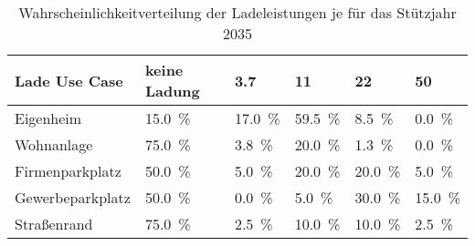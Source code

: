 {
\renewcommand{\arraystretch}{1.2}%
\begin{table}[H]
	\begin{center}
		\caption{Wahrscheinlichkeitverteilung der Ladeleistungen je \UC für das Stützjahr \num{2035}}
		\begin{tabu} to \textwidth {X[1.7] X[1.3, r] X[1, r] X[1, r] X[1, r] X[1, r]}
			\hline
			Lade Use   Case  & keine Ladung        & \SI{3.7}{\kw}       & \SI{11}{\kw}        & \SI{22}{\kw}        & \SI{50}{\kw}        \\ \hline
			Eigenheim        & \SI{15.0}{\percent} & \SI{17.0}{\percent} & \SI{59.5}{\percent} & \SI{8.5}{\percent}  & \SI{0.0}{\percent}  \\
			Wohnanlage       & \SI{75.0}{\percent} & \SI{3.8}{\percent}  & \SI{20.0}{\percent} & \SI{1.3}{\percent}  & \SI{0.0}{\percent}  \\
			Firmenparkplatz  & \SI{50.0}{\percent} & \SI{5.0}{\percent}  & \SI{20.0}{\percent} & \SI{20.0}{\percent} & \SI{5.0}{\percent}  \\
			Gewerbeparkplatz & \SI{50.0}{\percent} & \SI{0.0}{\percent}  & \SI{5.0}{\percent}  & \SI{30.0}{\percent} & \SI{15.0}{\percent} \\
			Straßenrand      & \SI{75.0}{\percent} & \SI{2.5}{\percent}  & \SI{10.0}{\percent} & \SI{10.0}{\percent} & \SI{2.5}{\percent}  \\ \hline
		\end{tabu}
		\label{tab:UCProbability2035}
	\end{center}
	\vspace{-3mm}%
\end{table}
}

